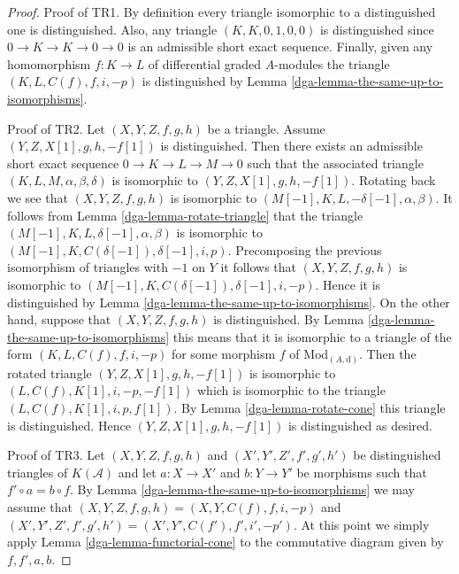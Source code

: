 \begin{proof}

Proof of TR1. By definition every triangle isomorphic to a distinguished
one is distinguished. Also, any triangle $(K, K, 0, 1, 0, 0)$
is distinguished since $0 \to K \to K \to 0 \to 0$ is
an admissible short exact sequence. Finally, given any homomorphism
$f : K \to L$ of differential graded $A$-modules the triangle
$(K, L, C(f), f, i, -p)$ is distinguished by
Lemma \ref{dga-lemma-the-same-up-to-isomorphisms}.

\medskip\noindent
Proof of TR2. Let $(X, Y, Z, f, g, h)$ be a triangle.
Assume $(Y, Z, X[1], g, h, -f[1])$ is distinguished.
Then there exists an admissible short exact sequence
$0 \to K \to L \to M \to 0$ such that the associated
triangle $(K, L, M, \alpha, \beta, \delta)$
is isomorphic to $(Y, Z, X[1], g, h, -f[1])$. Rotating back we see
that $(X, Y, Z, f, g, h)$ is isomorphic to
$(M[-1], K, L, -\delta[-1], \alpha, \beta)$.
It follows from Lemma \ref{dga-lemma-rotate-triangle} that the triangle
$(M[-1], K, L, \delta[-1], \alpha, \beta)$
is isomorphic to
$(M[-1], K, C(\delta[-1]), \delta[-1], i, p)$.
Precomposing the previous isomorphism of triangles with $-1$ on $Y$
it follows that $(X, Y, Z, f, g, h)$ is isomorphic to
$(M[-1], K, C(\delta[-1]), \delta[-1], i, -p)$.
Hence it is distinguished by
Lemma \ref{dga-lemma-the-same-up-to-isomorphisms}.
On the other hand, suppose that $(X, Y, Z, f, g, h)$ is distinguished.
By Lemma \ref{dga-lemma-the-same-up-to-isomorphisms} this means that it is
isomorphic to a triangle of the form
$(K, L, C(f), f, i, -p)$ for some morphism $f$ of
$\text{Mod}_{(A, \text{d})}$. Then the rotated triangle
$(Y, Z, X[1], g, h, -f[1])$ is
isomorphic to $(L, C(f), K[1], i, -p, -f[1])$ which is
isomorphic to the triangle
$(L, C(f), K[1], i, p, f[1])$.
By Lemma \ref{dga-lemma-rotate-cone} this triangle is distinguished.
Hence $(Y, Z, X[1], g, h, -f[1])$ is distinguished as desired.

\medskip\noindent
Proof of TR3. Let $(X, Y, Z, f, g, h)$ and $(X', Y', Z', f', g', h')$
be distinguished triangles of $K(\mathcal{A})$ and let $a : X \to X'$
and $b : Y \to Y'$ be morphisms such that $f' \circ a = b \circ f$. By
Lemma \ref{dga-lemma-the-same-up-to-isomorphisms} we may assume that
$(X, Y, Z, f, g, h) = (X, Y, C(f), f, i, -p)$ and
$(X', Y', Z', f', g', h') = (X', Y', C(f'), f', i', -p')$.
At this point we simply apply Lemma \ref{dga-lemma-functorial-cone}
to the commutative diagram given by $f, f', a, b$.
\end{proof}

